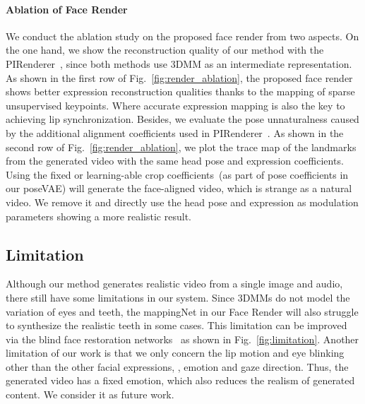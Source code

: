 



\paragraph{Ablation of Face Render}
We conduct the ablation study on the proposed face render from two aspects. On the one hand, we show the reconstruction quality of our method with the PIRenderer~\cite{ren2021pirenderer}, since both methods use 3DMM as an intermediate representation. As shown in the first row of Fig.~\ref{fig:render_ablation}, the proposed face render shows better expression reconstruction qualities thanks to the mapping of sparse unsupervised keypoints. Where accurate expression mapping is also the key to achieving lip synchronization. Besides, we evaluate the pose unnaturalness caused by the additional alignment coefficients used in PIRenderer~\cite{ren2021pirenderer}. As shown in the second row of Fig.~\ref{fig:render_ablation}, we plot the trace map of the landmarks from the generated video with the same head pose and expression coefficients. Using the fixed or learning-able crop coefficients~(as part of pose coefficients in our poseVAE) will generate the face-aligned video, which is strange as a natural video. We remove it and directly use the head pose and expression as modulation parameters showing a more realistic result.






\subsection{Limitation}
Although our method generates realistic video from a single image and audio, there still have some limitations in our system. Since 3DMMs do not model the variation of eyes and teeth, the mappingNet in our Face Render will also struggle to synthesize the realistic teeth in some cases. This limitation can be improved via the blind face restoration networks~\cite{gfpgan} as shown in Fig.~\ref{fig:limitation}. Another limitation of our work is that we only concern the lip motion and eye blinking other than the other facial expressions, \eg, emotion and gaze direction. Thus, the generated video has a fixed emotion, which also reduces the realism of generated content. We consider it as future work. 




